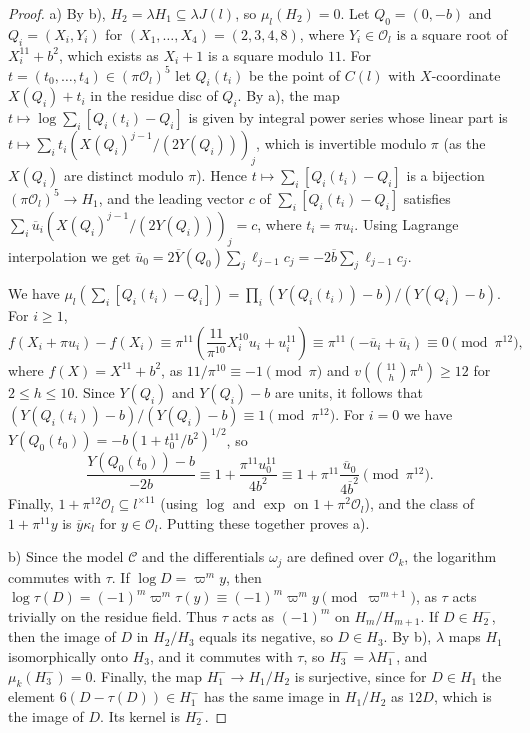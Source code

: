 \documentclass[11pt,reqno]{amsart}
\newcommand{\OO}{\mathcal{O}}
\theoremstyle{definition}
\numberwithin{equation}{section}
\begin{document}
\begin{proof}
a) By  b), $H_2=\lambda H_1\subseteq\lambda J(l)$, so $\mu_l(H_2)=0$. Let $Q_0=(0,-b)$ and $Q_i=(X_i,Y_i)$ for $(X_1,\ldots,X_4)=(2,3,4,8)$, where $Y_i\in\OO_l$ is a square root of $X_i^{11}+b^2$, which exists as $X_i+1$ is a square modulo $11$. For $t=(t_0,\ldots,t_4)\in(\pi\OO_l)^5$ let $Q_i(t_i)$ be the point of $C(l)$ with $X$-coordinate $X(Q_i)+t_i$ in the residue disc of $Q_i$. By  a), the map $t\mapsto \log\sum_i[Q_i(t_i)-Q_i]$ is given by integral power series whose linear part is $t\mapsto \sum_i t_i(X(Q_i)^{j-1}/(2Y(Q_i)))_j$, which is invertible modulo $\pi$ (as the $X(Q_i)$ are distinct modulo $\pi$). Hence $t\mapsto\sum_i[Q_i(t_i)-Q_i]$ is a bijection $(\pi\OO_l)^5\rightarrow H_1$, and the leading vector $c$ of $\sum_i[Q_i(t_i)-Q_i]$ satisfies $\sum_i \overline u_i(X(Q_i)^{j-1}/(2Y(Q_i)))_j=c$, where $t_i=\pi u_i$. Using Lagrange interpolation we get $\overline u_0=2\overline Y(Q_0)\sum_j\ell_{j-1}c_j=-2\overline b\sum_j\ell_{j-1}c_j$.

We have $\mu_l(\sum_i[Q_i(t_i)-Q_i])=\prod_i (Y(Q_i(t_i))-b)/(Y(Q_i)-b)$. For $i\geq 1$,
$$f(X_i+\pi u_i)-f(X_i)\equiv \pi^{11}\left(\frac{11}{\pi^{10}}X_i^{10}u_i+u_i^{11}\right)\equiv \pi^{11}(-\overline u_i+\overline u_i)\equiv 0\pmod{\pi^{12}},$$
where $f(X)=X^{11}+b^2$, as $11/\pi^{10}\equiv -1\pmod\pi$ and $v(\binom{11}{h}\pi^h)\geq 12$ for $2\leq h\leq 10$. Since $Y(Q_i)$ and $Y(Q_i)-b$ are units, it follows that $(Y(Q_i(t_i))-b)/(Y(Q_i)-b)\equiv 1\pmod{\pi^{12}}$. For $i=0$ we have $Y(Q_0(t_0))=-b(1+t_0^{11}/b^2)^{1/2}$, so
$$\frac{Y(Q_0(t_0))-b}{-2b}\equiv 1+\frac{\pi^{11}u_0^{11}}{4b^2}\equiv 1+\pi^{11}\frac{\overline u_0}{4\overline b^2}\pmod{\pi^{12}}.$$
Finally, $1+\pi^{12}\OO_l\subseteq l^{\times 11}$ (using $\log$ and $\exp$ on $1+\pi^2\OO_l$), and the class of $1+\pi^{11}y$ is $\overline y\kappa_l$ for $y\in\OO_l$. Putting these together proves a).

b) Since the model $\mathcal C$ and the differentials $\omega_j$ are defined over $\OO_k$, the logarithm commutes with $\tau$. If $\log D=\varpi^my$, then $\log\tau(D)=(-1)^m\varpi^m\tau(y)\equiv (-1)^m\varpi^my\pmod{\varpi^{m+1}}$, as $\tau$ acts trivially on the residue field. Thus $\tau$ acts as $(-1)^m$ on $H_m/H_{m+1}$. If $D\in H_2^-$, then the image of $D$ in $H_2/H_3$ equals its negative, so $D\in H_3$. By  b), $\lambda$ maps $H_1$ isomorphically onto $H_3$, and it commutes with $\tau$, so $H_3^-=\lambda H_1^-$, and $\mu_k(H_3^-)=0$. Finally, the map $H_1^-\rightarrow H_1/H_2$ is surjective, since for $D\in H_1$ the element $6(D-\tau(D))\in H_1^-$ has the same image in $H_1/H_2$ as $12D$, which is the image of $D$. Its kernel is $H_2^-$.
\end{proof}
\end{document}
